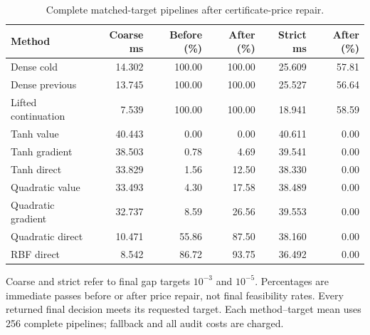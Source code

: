 \begin{table}[tbp]\centering\small
\caption{Complete matched-target pipelines after certificate-price repair.}\label{tab:r22-cost}
\begin{tabular}{lrrrrr}
\toprule
Method & Coarse ms & Before (\%) & After (\%) & Strict ms & After (\%)\\
\midrule
Dense cold & 14.302 & 100.00 & 100.00 & 25.609 & 57.81\\
Dense previous & 13.745 & 100.00 & 100.00 & 25.527 & 56.64\\
Lifted continuation & 7.539 & 100.00 & 100.00 & 18.941 & 58.59\\
Tanh value & 40.443 & 0.00 & 0.00 & 40.611 & 0.00\\
Tanh gradient & 38.503 & 0.78 & 4.69 & 39.541 & 0.00\\
Tanh direct & 33.829 & 1.56 & 12.50 & 38.330 & 0.00\\
Quadratic value & 33.493 & 4.30 & 17.58 & 38.489 & 0.00\\
Quadratic gradient & 32.737 & 8.59 & 26.56 & 39.553 & 0.00\\
Quadratic direct & 10.471 & 55.86 & 87.50 & 38.160 & 0.00\\
RBF direct & 8.542 & 86.72 & 93.75 & 36.492 & 0.00\\
\bottomrule
\end{tabular}
\par\smallskip\begin{minipage}{.98\textwidth}\small Coarse and strict refer to final gap targets $10^{-3}$ and $10^{-5}$. Percentages are immediate passes before or after price repair, not final feasibility rates. Every returned final decision meets its requested target. Each method--target mean uses 256 complete pipelines; fallback and all audit costs are charged.\end{minipage}
\end{table}
